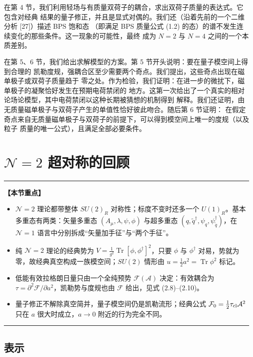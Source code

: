\documentclass[11pt,a4paper,UTF8,fontset=fandol]{ctexart}
\theoremstyle{plain}
\theoremstyle{definition}
\newenvironment{keypoints}{%
  \par\addvspace{0.9em}%
  \noindent\begin{minipage}{\linewidth}%
  \color{black!80}\rule{\linewidth}{0.6pt}\par\vspace{2pt}%
  \noindent\textbf{【本节重点】}\par\vspace{2pt}%
  \begin{itemize}[leftmargin=1.6em,itemsep=1pt,topsep=2pt,parsep=0pt]%
}{%
  \end{itemize}\vspace{1pt}\noindent\color{black!80}\rule{\linewidth}{0.6pt}%
  \end{minipage}\par\addvspace{0.9em}%
}
\newcommand{\Nc}{\mathcal{N}}
\def\Nc{N}%
\begin{document}
在第 4 节，我们利用轻场与有质量双荷子的耦合，求出双荷子质量的表达式。它包含对经典
结果的量子修正，并且是显式对偶的。我们还（沿着先前的一个二维分析 [27]）描述 BPS 饱和态
（即满足 BPS 质量公式 (1.2) 的态）的谱不发生连续变化的那些条件。这一现象的可能性，最终
成为 $\Nc=2$ 与 $\Nc=4$ 之间的一个本质差别。

在第 5、6 节，我们给出求解模型的方案。第 5 节开头说明：要在量子模空间上得到合理的
凯勒度规，强耦合区至少需要两个奇点。我们提出，这些奇点出现在磁单极子或双荷子质量趋于
零之处。作为检验，我们证明：在进一步的微扰下，磁单极子的凝聚恰好发生在预期电荷禁闭的
地方。这第一次给出了一个真实的相对论场论模型，其中电荷禁闭以这种长期被猜想的机制得到
解释。我们还证明，由无质量磁单极子与双荷子产生的单值性恰好彼此吻合。随后第 6 节证明：
在假定奇点来自无质量磁单极子与双荷子的前提下，可以得到模空间上唯一的度规（以及粒子
质量的唯一公式），且满足全部必要条件。




\section{$\mathcal N=2$ 超对称的回顾}

\begin{keypoints}
\item $\mathcal N=2$ 理论都带整体 $SU(2)_R$ 对称性；标度不变时还多一个 $U(1)_R$。基本多重态有两类：矢量多重态 $(A_\mu,\lambda,\psi,\phi)$ 与超多重态 $(q,\tilde q^\dagger,\psi_q,\psi^\dagger_{\tilde q})$，在 $\mathcal N=1$ 语言中分别拆成“矢量加手征”与“两个手征”。
\item 纯 $\mathcal N=2$ 理论的经典势为 $V=\frac{1}{g^2}\operatorname{Tr}[\phi,\phi^\dagger]^2$，只要 $\phi$ 与 $\phi^\dagger$ 对易，势就为零，故经典真空构成一族模空间；$SU(2)$ 情形由 $u=\frac12 a^2=\operatorname{Tr}\phi^2$ 标记。
\item 低能有效拉格朗日量只由一个全纯预势 $\mathcal F(\mathcal A)$ 决定：有效耦合为 $\tau=\partial^2\mathcal F/\partial a^2$，凯勒势与度规也由 $\mathcal F$ 给出，见式 (2.8)–(2.10)。
\item 量子修正不解除真空简并，量子模空间仍是凯勒流形；经典公式 $\mathcal F_0=\frac12\tau_{\rm cl}\mathcal A^2$ 只在 $a$ 很大时成立，$a\to 0$ 附近的行为完全不同。
\end{keypoints}

\subsection{表示}
\end{document}
